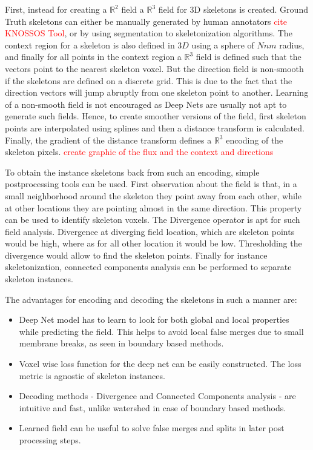 First, instead for creating a $\mathbb{R}^2$ field a $\mathbb{R}^3$ field for 3D skeletons is created. Ground Truth skeletons can either be manually generated by human annotators \textcolor{red}{cite KNOSSOS Tool}, or by using segmentation to skeletonization algorithms. The context region for a skeleton is also defined in $3D$ using a sphere of $N nm$ radius, and finally for all points in the context region a $\mathbb{R}^3$ field is defined such that the vectors point to the nearest skeleton voxel.
But the direction field is non-smooth if the skeletons are defined on a discrete grid. This is due to the fact that the direction vectors will jump abruptly from one skeleton point to another. Learning of a non-smooth field is not encouraged as Deep Nets are usually not apt to generate such fields. Hence, to create smoother versions of the field, first skeleton points are interpolated using splines and then a distance transform is calculated. Finally, the gradient of the distance transform defines a $\mathbb{R}^3$ encoding of the skeleton pixels. \textcolor{red}{create graphic of the flux and the context and directions}

To obtain the instance skeletons back from such an encoding, simple postprocessing tools can be used. First observation about the field is that, in a small neighborhood around the skeleton they point away from each other, while at other locations they are pointing almost in the same direction. This property can be used to identify skeleton voxels. The Divergence operator is apt for such field analysis. Divergence at diverging field location, which are skeleton points would be high, where as for all other location it would be low. Thresholding the divergence would allow to find the skeleton points. Finally for instance skeletonization, connected components analysis can be performed to separate skeleton instances.

The advantages for encoding and decoding the skeletons in such a manner are:
\begin{itemize}
	\item Deep Net model has to learn to look for both global and local properties while predicting the field. This helps to avoid local false merges due to small membrane breaks, as seen in boundary based methods.
	\item Voxel wise loss function for the deep net can be easily constructed. The loss metric is agnostic of skeleton instances.
	\item Decoding methods - Divergence and Connected Components analysis - are intuitive and fast, unlike watershed in case of boundary based methods.
	\item Learned field can be useful to solve false merges and splits in later post processing steps. 
\end{itemize}
